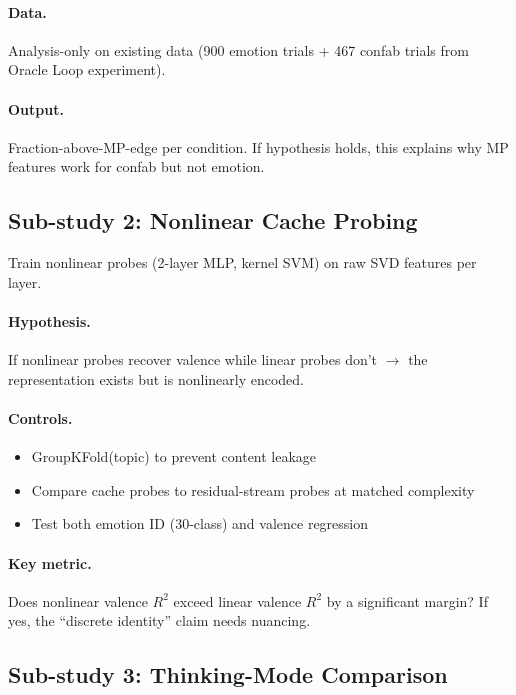 \documentclass[11pt,letterpaper]{article}
\begin{document}
\paragraph{Data.} Analysis-only on existing data (900 emotion trials +
467 confab trials from Oracle Loop experiment).

\paragraph{Output.} Fraction-above-MP-edge per condition. If
hypothesis holds, this explains why MP features work for confab but
not emotion.

\subsection*{Sub-study 2: Nonlinear Cache Probing}

Train nonlinear probes (2-layer MLP, kernel SVM) on raw SVD features
per layer.

\paragraph{Hypothesis.} If nonlinear probes recover valence while
linear probes don't $\rightarrow$ the representation exists but is
nonlinearly encoded.

\paragraph{Controls.}
\begin{itemize}
  \item GroupKFold(topic) to prevent content leakage
  \item Compare cache probes to residual-stream probes at matched
    complexity
  \item Test both emotion ID (30-class) and valence regression
\end{itemize}

\paragraph{Key metric.} Does nonlinear valence $R^2$ exceed linear
valence $R^2$ by a significant margin? If yes, the ``discrete
identity'' claim needs nuancing.

\subsection*{Sub-study 3: Thinking-Mode Comparison}
\end{document}
